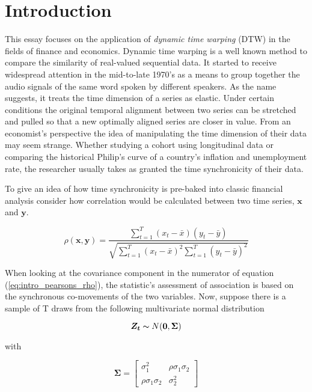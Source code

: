 
\section{Introduction}

This essay focuses on the application of \textit{dynamic time warping} (DTW) in the fields of finance and economics. Dynamic time warping is a well known method to compare the similarity of real-valued sequential data. It started to receive widespread attention in the mid-to-late 1970's \cite{SakoeChiba_IEEE_1978,Itakura_1975} as a means to group together the audio signals of the same word spoken by different speakers. As the name suggests, it treats the time dimension of a series as elastic. Under certain conditions the original temporal alignment between two series can be stretched and pulled so that a new optimally aligned series are closer in value. From an economist's perspective the idea of manipulating the time dimension of their data may seem strange. Whether studying a cohort using longitudinal data or comparing the historical Philip's curve of a country's inflation and unemployment rate, the researcher usually takes as granted the time synchronicity of their data.

 To give an idea of how time synchronicity is pre-baked into classic financial analysis consider how correlation would be calculated between two time series, $\boldsymbol{x}$ and $\boldsymbol{y}$.

\begin{equation} \label{eq:intro_pearsons_rho}
\rho(\boldsymbol{x}, \boldsymbol{y}) = \frac{ \sum_{t=1}^{T} (x_{t} - \bar{x}) (y_{t} - \bar{y})}{ \sqrt{\sum_{t=1}^{T} (x_{t} - \bar{x})^{2} \sum_{t=1}^{T} (y_{t} - \bar{y})^{2}}}
\end{equation}

When looking at the covariance component in the numerator of equation (\ref{eq:intro_pearsons_rho}), the statistic's assessment of association is based on the synchronous co-movements of the two variables. Now, suppose there is a sample of T draws from the following multivariate normal distribution

\begin{equation}
    \boldsymbol{Z_{t}} \thicksim N(\boldsymbol{0}, \boldsymbol{\Sigma})
\end{equation}

with 

\begin{equation}
    \boldsymbol{\Sigma} = \begin{bmatrix}
        \sigma_{1}^{2}             & \rho \sigma_{1}\sigma_{2} \\
        \rho \sigma_{1} \sigma_{2} & \sigma_{2}^{2} 
    \end{bmatrix}
\end{equation}

